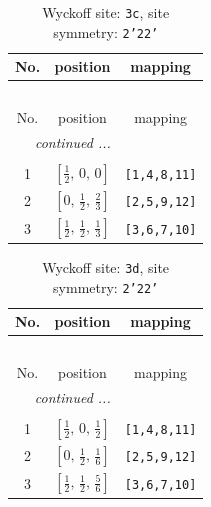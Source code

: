 \documentclass[fleqn,8pt]{jsarticle}
\begin{document}
\renewcommand{\arraystretch}{1.2}
\begin{longtable}{ccc}
\caption{Wyckoff site: {\tt 3c}, site symmetry: {\tt 2'22'}}
 \\
 \hline \hline
No. & position & mapping \\ \hline \endfirsthead

\multicolumn{2}{l}{\tablename\ \thetable{}} \\
 \hline \hline
No. & position & mapping \\ \hline \endhead

 \hline \hline
\multicolumn{2}{r}{\footnotesize\it continued ...} \\ \endfoot

 \hline \hline
\multicolumn{2}{r}{} \\ \endlastfoot

1 & $\left[ \frac{1}{2},\, 0,\, 0 \right]$ & {\tt [1,4,8,11]} \\ \hline
2 & $\left[ 0,\, \frac{1}{2},\, \frac{2}{3} \right]$ & {\tt [2,5,9,12]} \\ \hline
3 & $\left[ \frac{1}{2},\, \frac{1}{2},\, \frac{1}{3} \right]$ & {\tt [3,6,7,10]} \\
\end{longtable}
\renewcommand{\arraystretch}{1.2}
\begin{longtable}{ccc}
\caption{Wyckoff site: {\tt 3d}, site symmetry: {\tt 2'22'}}
 \\
 \hline \hline
No. & position & mapping \\ \hline \endfirsthead

\multicolumn{2}{l}{\tablename\ \thetable{}} \\
 \hline \hline
No. & position & mapping \\ \hline \endhead

 \hline \hline
\multicolumn{2}{r}{\footnotesize\it continued ...} \\ \endfoot

 \hline \hline
\multicolumn{2}{r}{} \\ \endlastfoot

1 & $\left[ \frac{1}{2},\, 0,\, \frac{1}{2} \right]$ & {\tt [1,4,8,11]} \\ \hline
2 & $\left[ 0,\, \frac{1}{2},\, \frac{1}{6} \right]$ & {\tt [2,5,9,12]} \\ \hline
3 & $\left[ \frac{1}{2},\, \frac{1}{2},\, \frac{5}{6} \right]$ & {\tt [3,6,7,10]} \\
\end{longtable}
\renewcommand{\arraystretch}{1.2}
\end{document}
